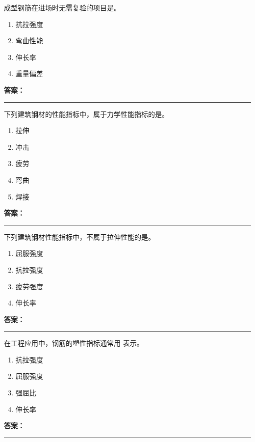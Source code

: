 \documentclass[UTF8,fontset=fandol,11pt]{ctexart}
\newcommand{\answerline}{\textcolor{answerred}{\rule{2.4cm}{0.7pt}}}
\begin{document}
\begin{quizbox}[title={第 5 题}]
成型钢筋在进场时无需复验的项目是。\\
\begin{enumerate}[label=\Alph*.]
\item 抗拉强度
\item 弯曲性能
\item 伸长率
\item 重量偏差
\end{enumerate}
\textbf{\textcolor{answerred}{答案：}} \answerline
\end{quizbox}

\begin{quizbox}[title={第 6 题}]
下列建筑钢材的性能指标中，属于力学性能指标的是。\\
\begin{enumerate}[label=\Alph*.]
\item 拉伸
\item 冲击
\item 疲劳
\item 弯曲
\item 焊接
\end{enumerate}
\textbf{\textcolor{answerred}{答案：}} \answerline
\end{quizbox}

\begin{quizbox}[title={第 7 题}]
下列建筑钢材性能指标中，不属于拉伸性能的是。\\
\begin{enumerate}[label=\Alph*.]
\item 屈服强度
\item 抗拉强度
\item 疲劳强度
\item 伸长率
\end{enumerate}
\textbf{\textcolor{answerred}{答案：}} \answerline
\end{quizbox}

\begin{quizbox}[title={第 8 题}]
在工程应用中，钢筋的塑性指标通常用 表示。\\
\begin{enumerate}[label=\Alph*.]
\item 抗拉强度
\item 屈服强度
\item 强屈比
\item 伸长率
\end{enumerate}
\textbf{\textcolor{answerred}{答案：}} \answerline
\end{quizbox}
\end{document}
